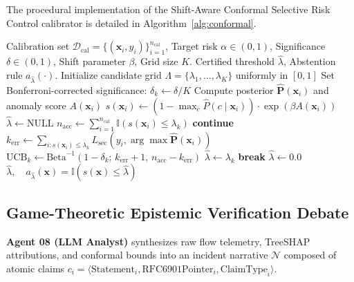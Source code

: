 \documentclass{ieeeaccess}
\begin{document}
The procedural implementation of the Shift-Aware Conformal Selective Risk Control calibrator is detailed in Algorithm~\ref{alg:conformal}.

\begin{algorithm}[t]
\caption{Shift-Aware Conformal Selective Risk Control (SAC-SRC)}
\label{alg:conformal}
\begin{algorithmic}[1]
\REQUIRE Calibration set $\mathcal{D}_{\text{cal}} = \{(\mathbf{x}_i, y_i)\}_{i=1}^{n_{\text{cal}}}$, Target risk $\alpha \in (0, 1)$, Significance $\delta \in (0, 1)$, Shift parameter $\beta$, Grid size $K$.
\ENSURE Certified threshold $\hat{\lambda}$, Abstention rule $a_{\hat{\lambda}}(\cdot)$.
\STATE Initialize candidate grid $\Lambda = \{\lambda_1, \dots, \lambda_K\}$ uniformly in $[0, 1]$
\STATE Set Bonferroni-corrected significance: $\delta_k \leftarrow \delta / K$
    \STATE Compute posterior $\hat{\mathbf{P}}(\mathbf{x}_i)$ and anomaly score $A(\mathbf{x}_i)$
    \STATE $s(\mathbf{x}_i) \leftarrow (1 - \max_c \hat{P}(c \mid \mathbf{x}_i)) \cdot \exp(\beta A(\mathbf{x}_i))$
\ENDFOR
\STATE $\hat{\lambda} \leftarrow \text{NULL}$
    \STATE $n_{\text{acc}} \leftarrow \sum_{i=1}^{n_{\text{cal}}} \mathbb{I}(s(\mathbf{x}_i) \le \lambda_k)$
        \STATE \textbf{continue}
    \ENDIF
    \STATE $k_{\text{err}} \leftarrow \sum_{i: s(\mathbf{x}_i) \le \lambda_k} L_{\text{sec}}(y_i, \arg\max \hat{\mathbf{P}}(\mathbf{x}_i))$
    \STATE $\text{UCB}_k \leftarrow \text{Beta}^{-1}(1 - \delta_k;\, k_{\text{err}} + 1,\, n_{\text{acc}} - k_{\text{err}})$
        \STATE $\hat{\lambda} \leftarrow \lambda_k$
        \STATE \textbf{break} 
    \ENDIF
\ENDFOR
{}
    \STATE $\hat{\lambda} \leftarrow 0.0$ 
\ENDIF
\RETURN $\hat{\lambda}, \quad a_{\hat{\lambda}}(\mathbf{x}) = \mathbb{I}(s(\mathbf{x}) \le \hat{\lambda})$
\end{algorithmic}
\end{algorithm}

\subsection{Game-Theoretic Epistemic Verification Debate}
\textbf{Agent 08 (LLM Analyst)} synthesizes raw flow telemetry, TreeSHAP attributions, and conformal bounds into an incident narrative $\mathcal{N}$ composed of atomic claims $c_i = \langle \text{Statement}_i, \text{RFC6901Pointer}_i, \text{ClaimType}_i \rangle$.
\end{document}
